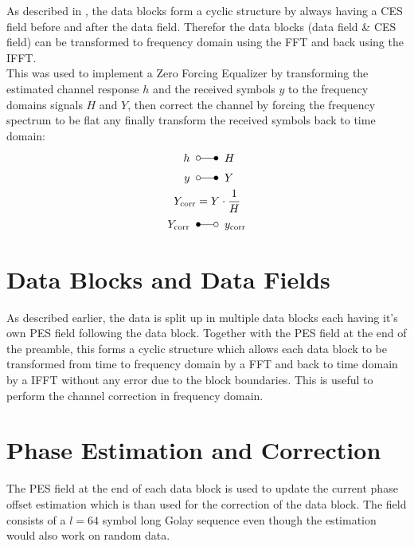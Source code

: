 As described in , the data blocks form a cyclic
structure by always having a \gls{CES} field before and after the data field.
Therefor the data blocks (data field \& \gls{CES} field) can be transformed
to frequency domain using the \gls{FFT} and back using the \gls{IFFT}. \\

This was used to implement a Zero Forcing Equalizer by transforming
the estimated channel response $h$ and the received symbols $y$
to the frequency domains signals $H$ and $Y$, then correct the channel
by forcing the frequency spectrum to be flat any finally transform
the received symbols back to time domain: \\

\begin{align}
  h \;\;&\laplace\;\; H \\
  y \;\;&\laplace\;\; Y \\
  Y_{\text{corr}} &= Y \cdot \frac{1}{H} \\
  Y_{\text{corr}} \;\;&\Laplace\;\; y_{\text{corr}}
\end{align}

\section{Data Blocks and Data Fields}
\label{sec:sys_data}

As described earlier, the data is split up in multiple data blocks
each having it's own \gls{PES} field following the data block.
Together with the \gls{PES} field at the end of the preamble, this forms
a cyclic structure which allows each data block to be transformed
from time to frequency domain by a \gls{FFT} and back to time domain
by a \gls{IFFT} without any error due to the block boundaries.
This is useful to perform the channel correction in frequency domain. \\

\section{Phase Estimation and Correction}
\label{sec:sys_pes}

The \gls{PES} field at the end of each data block is used to update
the current phase offset estimation which is than used for the correction
of the data block. The field consists of a $l=64$ symbol long Golay
sequence even though the estimation would also work on random data. \\

